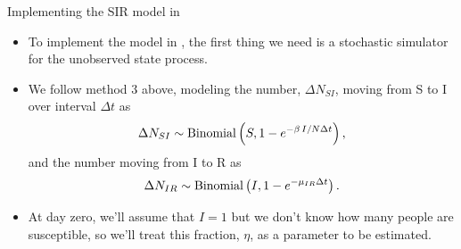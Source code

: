 \begin{frame}{Implementing the SIR model in }

  \begin{itemize}

  \item To implement the model in , the first thing we need is a stochastic simulator for the unobserved state process.

  \item  We follow method 3 above, modeling the number, $\Delta{N_{SI}}$, moving from S to I over interval $\Delta{t}$ as
    $$\Delta{N_{SI}} \sim \mathrm{Binomial}\left(S,1-e^{-\beta\,I/N\Delta{t}}\right),$$
    and the number moving from I to R as
    $$\Delta{N_{IR}} \sim \mathrm{Binomial}\left(I,1-e^{-\mu_{IR}\Delta{t}}\right).$$
    
    \framebreak

\begin{knitrout}\small
{}\color{fgcolor}\begin{kframe}
\begin{alltt}
 \hlkwb{<-}  \hlstd{(}\hlstd{,} \hlstd{,} \hlstd{,} \hlstd{,} \hlstd{,} \hlstd{,} \hlstd{,} \hlstd{) \{}
   \hlkwb{<-} \hlstd{(}\hlstd{=}\hlstd{,}\hlstd{=}\hlopt{-}\hlstd{(}\hlopt{-}\hlopt{*}\hlopt{/}\hlopt{*}
   \hlkwb{<-} \hlstd{(}\hlstd{=}\hlstd{,}\hlstd{=}\hlopt{-}\hlstd{(}\hlopt{-}\hlopt{*}
   \hlkwb{<-}  \hlopt{-} 
   \hlkwb{<-}  \hlopt{+}  \hlopt{-} 
   \hlkwb{<-}  \hlopt{+} 
  \hlstd{(}     
\hlstd{\}}
\end{alltt}
\end{kframe}
\end{knitrout}
  
  
\item At day zero, we'll assume that $I=1$ but we don't know how many people are susceptible, so we'll treat this fraction, $\eta$, as a parameter to be estimated.


\end{itemize}
\end{frame}
